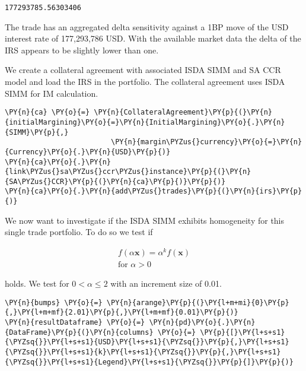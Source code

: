             \begin{tcolorbox}[breakable, size=fbox, boxrule=.5pt, pad at break*=1mm, opacityfill=0]
\begin{Verbatim}[commandchars=\\\{\}]
177293785.56303406
\end{Verbatim}
\end{tcolorbox}
        
    The trade has an aggregated delta sensitivity against a 1BP move of the
USD interest rate of 177,293,786 USD. With the available market data the
delta of the IRS appears to be slightly lower than one.

    
    We create a collateral agreement with associated ISDA SIMM and SA CCR
model and load the IRS in the portfolio. The collateral agreement uses
ISDA SIMM for IM calculation.

    \begin{tcolorbox}[breakable, size=fbox, boxrule=1pt, pad at break*=1mm,colback=cellbackground, colframe=cellborder]
\begin{Verbatim}[commandchars=\\\{\}]
\PY{n}{ca} \PY{o}{=} \PY{n}{CollateralAgreement}\PY{p}{(}\PY{n}{initialMargining}\PY{o}{=}\PY{n}{InitialMargining}\PY{o}{.}\PY{n}{SIMM}\PY{p}{,}
                         \PY{n}{margin\PYZus{}currency}\PY{o}{=}\PY{n}{Currency}\PY{o}{.}\PY{n}{USD}\PY{p}{)}
\PY{n}{ca}\PY{o}{.}\PY{n}{link\PYZus{}sa\PYZus{}ccr\PYZus{}instance}\PY{p}{(}\PY{n}{SA\PYZus{}CCR}\PY{p}{(}\PY{n}{ca}\PY{p}{)}\PY{p}{)}
\PY{n}{ca}\PY{o}{.}\PY{n}{add\PYZus{}trades}\PY{p}{(}\PY{n}{irs}\PY{p}{)}
\end{Verbatim}
\end{tcolorbox}

    We now want to investigate if the ISDA SIMM exhibits homogeneity for
this single trade portfolio. To do so we test if

\begin{align*}
f\left(\alpha \mathbf{x}\right) = \alpha^k f\left(\mathbf{x}\right) \\
        \text{for } \alpha >0
\end{align*}

holds. We test for \(0<\alpha\leq 2\) with an increment size of 0.01.

    \begin{tcolorbox}[breakable, size=fbox, boxrule=1pt, pad at break*=1mm,colback=cellbackground, colframe=cellborder]
\begin{Verbatim}[commandchars=\\\{\}]
\PY{n}{bumps} \PY{o}{=} \PY{n}{arange}\PY{p}{(}\PY{l+m+mi}{0}\PY{p}{,}\PY{l+m+mf}{2.01}\PY{p}{,}\PY{l+m+mf}{0.01}\PY{p}{)}
\PY{n}{resultDataframe} \PY{o}{=} \PY{n}{pd}\PY{o}{.}\PY{n}{DataFrame}\PY{p}{(}\PY{n}{columns} \PY{o}{=} \PY{p}{[}\PY{l+s+s1}{\PYZsq{}}\PY{l+s+s1}{USD}\PY{l+s+s1}{\PYZsq{}}\PY{p}{,}\PY{l+s+s1}{\PYZsq{}}\PY{l+s+s1}{k}\PY{l+s+s1}{\PYZsq{}}\PY{p}{,}\PY{l+s+s1}{\PYZsq{}}\PY{l+s+s1}{Legend}\PY{l+s+s1}{\PYZsq{}}\PY{p}{]}\PY{p}{)}
\end{Verbatim}
\end{tcolorbox}

